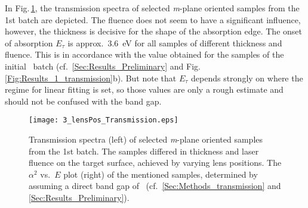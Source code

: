 In Fig.\,\ref{Fig:Results_3_lensTransmission}, the transmission spectra of selected \textit{m}-plane oriented samples from the 1st batch are depicted.
The fluence does not seem to have a significant influence, however, the thickness is decisive for the shape of the absorption edge.
The onset of absorption $E_\tau$ is approx.\ \qty{3.6}{\eV} for all samples of different thickness and fluence.
This is in accordance with the value obtained for the samples of the initial \cro\ batch (cf.~\ref{Sec:Results_Preliminary} and Fig.\,\ref{Fig:Results_1_transmission}b).
But note that $E_\tau$ depends strongly on where the regime for linear fitting is set, so those values are only a rough estimate and should not be confused with the band gap.

\begin{figure}
    \centering
    \texttt{[image: 3\_lensPos\_Transmission.eps]}
    \caption{
        Transmission spectra (left) of selected \textit{m}-plane oriented samples from the 1st batch.
        The samples differed in thickness and laser fluence on the target surface, achieved by varying lens positions.
        The $\alpha^2$ vs.\ $E$ plot (right) of the mentioned samples, determined by assuming a direct band gap of \cro\ (cf.~\ref{Sec:Methods_transmission} and \ref{Sec:Results_Preliminary}).
    }
    \label{Fig:Results_3_lensTransmission}
\end{figure}